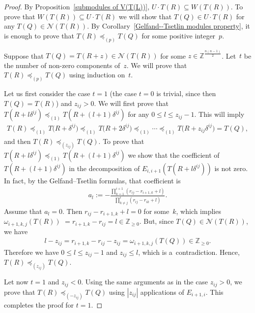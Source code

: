 \documentclass[pdftex]{sigma}
\numberwithin{equation}{section}
\begin{document}
\begin{proof}
By Proposition~\ref{submodules of V(T(L))}, $U\cdot T(R)\subseteq W(T(R))$.
To prove that $ W(T(R))\subseteq U\cdot T(R)$ we will show that $T(Q)\in U\cdot T(R)$ for any
$T(Q)\in\mathcal{N}(T(R))$.
By Corollary~\ref{Gelfand--Tsetlin modules property}, it is enough to prove that $T(R)\preceq_{(p)} T(Q)$ for some
positive integer~$p$.

Suppose that $T(Q)=T(R+z)\in \mathcal{N}(T(R))$ for some $z\in\mathbb{\mathbb{Z}}^{\frac{n(n-1)}{2}}$.
Let~$t$ be the number of non-zero components of~$z$.
We will prove that $T(R)\preceq_{(p)} T(Q)$ using induction on~$t$.

Let us f\/irst consider the case $t=1$ (the case $t=0$ is trivial, since then $T(Q)=T(R)$) and $z_{ij}>0$.
We will f\/irst prove that $T(R+l\delta^{ij})\preceq_{(1)}T(R+(l+1)\delta^{ij})$ for any $0\leq l \leq z_{ij}-1$.
This will imply
\begin{gather*}
T(R)\preceq_{(1)}T\big(R+\delta^{ij}\big)\preceq_{(1)}T\big(R+2\delta^{ij}\big)\preceq_{(1)}\cdots\preceq_{(1)}T\big(R+z_{ij}\delta^{ij}\big)=T(Q),
\end{gather*}
and then $T(R)\preceq_{(z_{ij})}T(Q)$.
To prove that $T(R+l\delta^{ij})\preceq_{(1)}T(R+(l+1)\delta^{ij})$ we show that the coef\/f\/icient of
$T(R+(l+1)\delta^{ij})$ in the decomposition of $E_{i,i+1}(T(R+l\delta^{ij}))$ is not zero.
In fact, by the Gelfand--Tsetlin formulas, that coef\/f\/icient is
\begin{gather*}
a_{l}:=-\frac{\prod\limits_{k=1}^{i+1}(r_{ij}-r_{i+1,k}+l)}{\prod\limits_{k\neq j}^{i}(r_{ij}-r_{ik}+l)}.
\end{gather*}
Assume that $a_{l}=0$.
Then $r_{ij}-r_{i+1,k}+l=0$ for some~$k$, which implies $\omega_{i+1,k,j}(T(R))$ $=r_{i+1,k}-r_{ij}=l\in\mathbb{Z}_{\geq
0}$.
But, since $T(Q)\in\mathcal{N}(T(R))$, we have{\samepage
\begin{gather*}
l-z_{ij}=r_{i+1,k}-r_{ij}-z_{ij}=\omega_{i+1,k,j}(T(Q))\in\mathbb{Z}_{\geq{0}}.
\end{gather*}
Therefore we have %
$ 0\leq l \leq z_{ij}-1$ and $z_{ij}\leq l$, which is a~contradiction.
Hence,
$T(R)\preceq_{(z_{ij})}T(Q)$.}

Let now $t=1$ and $z_{ij}<0$.
Using the same arguments as in the case $z_{ij}>0$, we prove that $T(R)\preceq_{(-z_{ij})}T(Q)$ using $|z_{ij}|$
applications of $E_{i+1,i}$.
This completes the proof for $t=1$.


\end{proof}
\end{document}
